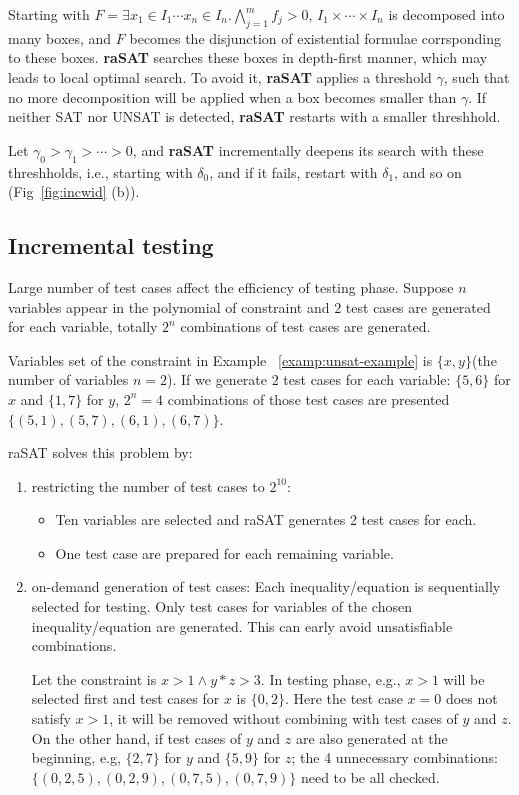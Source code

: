Starting with $F = \exists x_1 \in I_1 \cdots x_n \in I_n. \bigwedge \limits_{j=1}^m f_j > 0$, 
$I_1 \times \cdots \times I_n$ is decomposed into many boxes, 
and $F$ becomes the disjunction of existential formulae corrsponding to these boxes. 
{\bf raSAT} searches these boxes in depth-first manner, which may leads to local optimal search. 
To avoid it, {\bf raSAT} applies a threshold $\gamma$, such that no more decomposition will be 
applied when a box becomes smaller than $\gamma$. 
If neither SAT nor UNSAT is detected, {\bf raSAT} restarts with a smaller threshhold. 

Let $\gamma_0 > \gamma_1 > \cdots > 0$, and {\bf raSAT} incrementally deepens its search 
with these threshholds, i.e., starting with $\delta_0$, and if it fails, restart with $\delta_1$, 
and so on (Fig~\ref{fig:incwid} (b)). 

\subsection{Incremental testing}
Large number of test cases affect the efficiency of testing phase. Suppose $n$ variables appear in the polynomial of constraint and $2$ test cases are generated for each variable, totally $2^n$ combinations of test cases are generated. 

\begin{example}
Variables set of the constraint in Example ~\ref{examp:unsat-example} is $\{x, y\}$(the number of variables $n = 2$). If we generate $2$ test cases for each variable: $\{5, 6\}$ for $x$ and $\{1, 7\}$ for $y$, $2^n = 4$ combinations of those test cases are presented $\{(5, 1), (5, 7), (6, 1), (6, 7)\}$.
\end{example}
raSAT solves this problem by:
\begin{enumerate}
\item restricting the number of test cases to $2^{10}$:
\begin{itemize}
\item Ten variables are selected and raSAT generates 2 test cases for each.
\item One test case are prepared for each remaining variable.
\end{itemize}
\item on-demand generation of test cases:
Each inequality/equation is sequentially selected for testing. Only test cases for variables of the chosen inequality/equation are generated. This can early avoid unsatisfiable combinations.
\begin{example}
Let the constraint is $x > 1 \wedge y*z > 3$. In testing phase, e.g., $x > 1$ will be selected first and test cases for $x$ is $\{0, 2\}$. Here the test case $x = 0$ does not satisfy $x>1$, it will be removed without combining with test cases of $y$ and $z$. On the other hand, if test cases of $y$ and $z$ are also generated at the beginning, e.g, $\{2, 7\}$ for $y$ and $\{5, 9\}$ for $z$; the 4 unnecessary combinations: $\{(0, 2, 5),(0, 2, 9),(0, 7, 5), (0, 7, 9)\}$ need to be all checked.
\end{example}
\end{enumerate}

